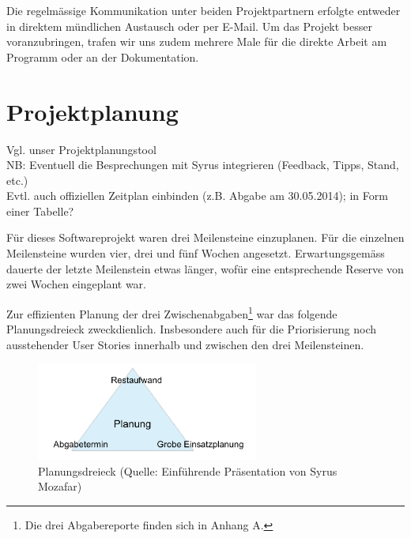 Die regelmässige Kommunikation unter beiden Projektpartnern erfolgte entweder in direktem mündlichen Austausch oder per E-Mail. Um das Projekt besser voranzubringen, trafen wir uns zudem mehrere Male für die direkte Arbeit am Programm oder an der Dokumentation.



\section{Projektplanung}



Vgl. unser Projektplanungstool \\

NB: Eventuell die Besprechungen mit Syrus integrieren (Feedback, Tipps, Stand, etc.) \\

Evtl. auch offiziellen Zeitplan einbinden (z.B. Abgabe am 30.05.2014); in Form einer Tabelle? \\

\vspace*{1cm}



Für dieses Softwareprojekt waren drei Meilensteine einzuplanen. Für die einzelnen Meilensteine wurden vier, drei und fünf Wochen angesetzt. Erwartungsgemäss dauerte der letzte Meilenstein etwas länger, wofür eine entsprechende Reserve von zwei Wochen eingeplant war.

Zur effizienten Planung der drei Zwischenabgaben\footnote{Die drei Abgabereporte finden sich in Anhang A.} war das folgende Planungsdreieck zweckdienlich. Insbesondere auch für die Priorisierung noch ausstehender User Stories innerhalb und zwischen den drei Meilensteinen. \\


\begin{figure}[h]
  \centering
	\includegraphics [width=0.65\textwidth]{images/Planungsdreieck_Quelle.png} 
	\caption{Planungsdreieck (Quelle: Einführende Präsentation von Syrus Mozafar)}
\end{figure}




